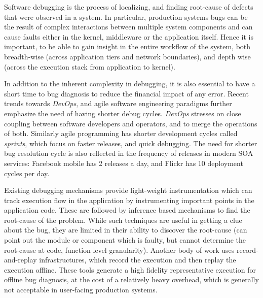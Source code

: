 Software debugging is the process of localizing, and finding root-cause of defects that were observed in a system.
In particular, production systems bugs can be the result of complex interactions between multiple system components and can cause faults either in the kernel, middleware or the application itself.
Hence it is important, to be able to gain insight in the entire workflow of the system, both breadth-wise (across application tiers and network boundaries), and depth wise (across the execution stack from application to kernel).

In addition to the inherent complexity in debugging, it is also essential to have a short time to bug diagnosis to reduce the financial impact of any error.
Recent trends towards \emph{DevOps}, and agile software engineering paradigms further emphasize the need of having shorter debug cycles.
\emph{DevOps} stresses on close coupling between software developers and operators, and to merge the operations of both.
Similarly agile programming has shorter development cycles called \textit{sprints}, which focus on faster releases, and quick debugging.
The need for shorter bug resolution cycle is also reflected in the frequency of releases in modern SOA services: Facebook mobile has 2 releases a day, and Flickr has 10 deployment cycles per day.


Existing debugging mechanisms provide light-weight instrumentation which can track execution flow in the application by instrumenting important points in the application code.
These are followed by inference based mechanisms to find the root-cause of the problem.
While such techniques are useful in getting a clue about the bug, they are limited in their ability to discover the root-cause (can point out the module or component which is faulty, but cannot determine the root-cause at code, function level granularity).
Another body of work uses record-and-replay infrastructures, which record the execution and then replay the execution offline.
These tools generate a high fidelity representative execution for offline bug diagnosis, at the cost of a relatively heavy overhead, which is generally not acceptable in user-facing production systems.


